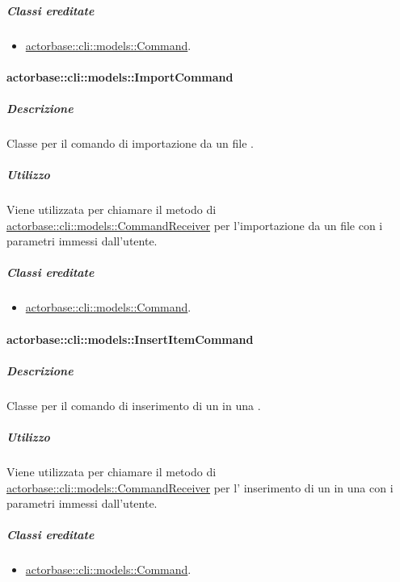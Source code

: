 \documentclass{scalatekids-article}
\begin{document}
\subparagraph{Classi ereditate}

\begin{itemize}
\item \hyperref[sec:actorbase::cli::models::Command]{actorbase::cli::models::Command}.
\end{itemize}

\paragraph{actorbase::cli::models::ImportCommand}
\label{sec:actorbase::cli::models::ImportCommand}

\subparagraph{Descrizione}

Classe per il comando di importazione da un file .

\subparagraph{Utilizzo}

Viene utilizzata per chiamare il metodo di
\hyperref[sec:actorbase::cli::models::CommandReceiver]{actorbase::cli::models::CommandReceiver} per l'importazione da un file
 con i parametri immessi dall'utente.

\subparagraph{Classi ereditate}

\begin{itemize}
\item \hyperref[sec:actorbase::cli::models::Command]{actorbase::cli::models::Command}.
\end{itemize}

\paragraph{actorbase::cli::models::InsertItemCommand}
\label{sec:actorbase::cli::models::InsertItemCommand}

\subparagraph{Descrizione}

Classe per il comando di inserimento di un  in una
.

\subparagraph{Utilizzo}

Viene utilizzata per chiamare il metodo di \hyperref[sec:actorbase::cli::models::CommandReceiver]{actorbase::cli::models::CommandReceiver} per l' inserimento di un  in una  con i parametri immessi dall'utente.

\subparagraph{Classi ereditate}

\begin{itemize}
\item \hyperref[sec:actorbase::cli::models::Command]{actorbase::cli::models::Command}.
\end{itemize}
\end{document}
